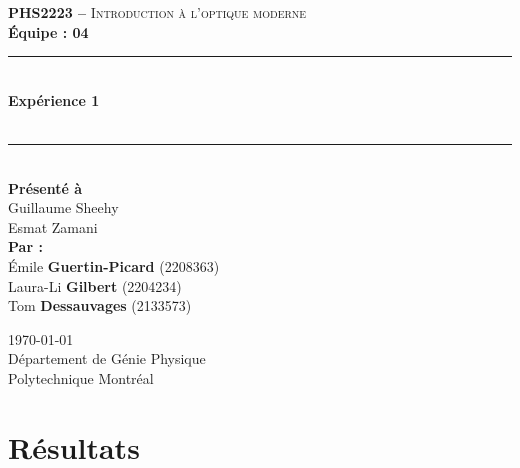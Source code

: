 \documentclass[11pt,letterpaper]{article}
\begin{document}
\begin{titlepage}
\center

\begin{figure}
\end{figure}
\vspace*{2 cm}

\textsc{\Large \textbf{PHS2223 --} Introduction à l'optique moderne}\\[0.5cm]
\large{\textbf{Équipe : 04}}\\[1.5cm]

\rule{\linewidth}{0.5mm} \\[0.5cm]
\Large{\textbf{Expérience 1}} \\[0.2cm]
\\
\rule{\linewidth}{0.2mm} \\[2.3cm]

\large{\textbf{Présenté à}\\
  Guillaume Sheehy\\
  Esmat Zamani\\[2.5cm]
  \textbf{Par :}\\
  Émile \textbf{Guertin-Picard} (2208363)\\
  Laura-Li \textbf{Gilbert} (2204234)\\
  Tom \textbf{Dessauvages} (2133573)\\[3cm]}

\large{\today\\
Département de Génie Physique\\
Polytechnique Montréal\\}

\end{titlepage}


\tableofcontents
{}
\newpage

\pagestyle{fancy}
\setlength{\headheight}{14pt}
\renewcommand{\headrulewidth}{0pt}
\fancyfoot[R]{\thepage}

\pagestyle{fancy}
\fancyhf{}
\renewcommand{\headrulewidth}{1pt}
\fancyhead[R]{\today}
\fancyfoot[R]{\thepage}

\setcounter{page}{1}


\section{Résultats}
\end{document}

